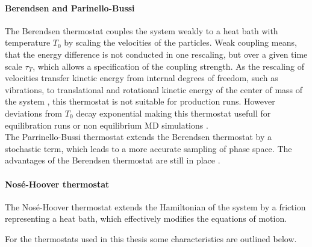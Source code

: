\paragraph{Berendsen and Parinello-Bussi}
The Berendsen thermostat \autocite{berendsen} couples the system weakly to a heat bath with temperature $T_0$ by scaling the velocities of the particles. Weak coupling means, that the energy difference is not conducted in one rescaling, but over a given time scale $\tau_T$, which allows a specification of the coupling strength. As the rescaling of velocities transfer kinetic energy from internal degrees of freedom, such as vibrations, to translational and rotational kinetic energy of the center of mass of the system \autocite[p. 738]{velRescaleSucks}, this thermostat is not suitable for production runs. However deviations from $T_0$ decay exponential making this thermostat usefull for equilibration runs or non equilibrium MD simulations \autocite[p. 3689]{berendsen}.\\
The Parrinello-Bussi  thermostat \autocite{parinelloBussi} extends the Berendsen thermostat by a stochastic term, which leads to a more accurate sampling of phase space. The advantages of the Berendsen thermostat are still in place \autocite[p. 31]{gromacsManual}.
\paragraph{Nosé-Hoover thermostat}
The Nosé-Hoover thermostat \autocites{nosehooverthermo}{nosehooverthermo2} extends the Hamiltonian of the system by a friction representing a heat bath, which effectively modifies the equations of motion.






 For the thermostats used in this thesis some characteristics are outlined below.
